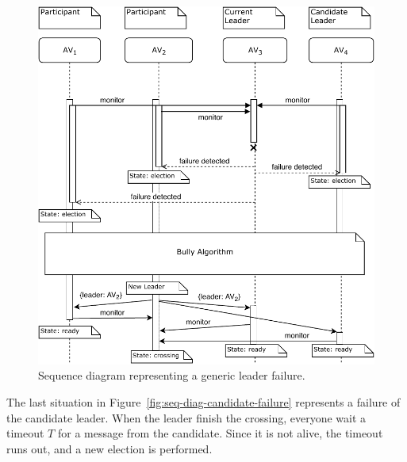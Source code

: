 \documentclass{memoir}
\begin{document}
\begin{figure}
	\centering
	\includegraphics[width=\linewidth]{sequence_diagrams/leader_sw_failure.pdf}
	\caption{Sequence diagram representing a generic leader failure.}
	\label{fig:seq-diag-leader-sw-failure}
\end{figure}

The last situation in Figure~\ref{fig:seq-diag-candidate-failure} represents a failure of the candidate leader. When the leader finish the crossing, everyone wait a timeout $T$ for a message from the candidate. Since it is not alive, the timeout runs out, and a new election is performed.
\end{document}
